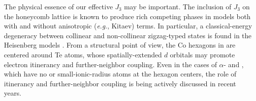 \documentclass[%
reprint,
superscriptaddress,
amsmath,amssymb,
aps,
prb,
]{revtex4-2}
\begin{document}
The physical essence of our effective $J_3$ may be important. The inclusion of $J_3$ on the honeycomb lattice is known to produce rich competing phases in models both with \cite{KatukuriNJP2014,RauPRL2014,SizyukPRB2014,WinterPRB2016,KimchiPRB2011} and without \cite{FouetEPJB2001,MessioPRB2011} anisotropic (\textit{e.g.}, Kitaev) terms. In particular, a classical-energy degeneracy between collinear and non-collinear zigzag-typed states is found in the Heisenberg models \cite{MessioPRB2011}. From a structural point of view, the Co hexagons in  are centered around Te atoms, whose spatially-extended $d$ orbitals may promote electron itinerancy and further-neighbor coupling. Even in the cases of $\alpha$- and , which have no or small-ionic-radius atoms at the hexagon centers, the role of itinerancy \cite{MazinPRL2012,FoyevtsovaPRB2013} and further-neighbor coupling \cite{JanssenPRB2017,MaksimovPRR2020,LaurellNPJQM2020} is being actively discussed in recent years.
	
\end{document}
